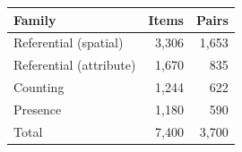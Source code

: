 \begin{tabular}{lrr}
\toprule
Family & Items & Pairs \\
\midrule
Referential (spatial) & 3{,}306 & 1{,}653 \\
Referential (attribute) & 1{,}670 & 835 \\
Counting & 1{,}244 & 622 \\
Presence & 1{,}180 & 590 \\
\midrule
Total & 7{,}400 & 3{,}700 \\
\bottomrule
\end{tabular}
